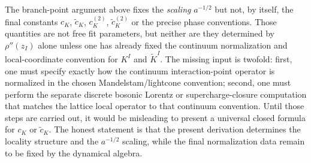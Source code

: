 \documentclass[11pt]{article}
\numberwithin{equation}{section}
\begin{document}
The branch-point argument above fixes the \emph{scaling} $a^{-1/2}$ but not, by itself, the final constants $c_K$, $\widetilde c_K$, $c_K^{(2)}$, $\widetilde c_K^{(2)}$ or the precise phase conventions. Those quantities are not free fit parameters, but neither are they determined by $\rho''(z_I)$ alone unless one has already fixed the continuum normalization and local-coordinate convention for $K^I$ and $\widetilde K^I$. The missing input is twofold: first, one must specify exactly how the continuum interaction-point operator is normalized in the chosen Mandelstam/lightcone convention; second, one must perform the separate discrete bosonic Lorentz or supercharge-closure computation that matches the lattice local operator to that continuum convention. Until those steps are carried out, it would be misleading to present a universal closed formula for $c_K$ or $\widetilde c_K$. The honest statement is that the present derivation determines the locality structure and the $a^{-1/2}$ scaling, while the final normalization data remain to be fixed by the dynamical algebra.
\end{document}
